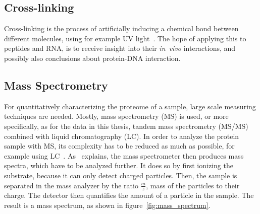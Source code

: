 	\subsection{Cross-linking}
	\label{lab:background:cross-linking}
	Cross-linking is the process of artificially inducing a chemical bond between different molecules, using for example UV light~\cite{Sachsenberg2017}. The hope of applying this to peptides and RNA, is to receive insight into their \textit{in~vivo} interactions, and possibly also conclusions about protein-DNA interaction.\\
	\subsection{Mass Spectrometry}
	\label{lab:background:ms}
	For quantitatively characterizing the proteome of a sample, large scale measuring techniques are needed. Mostly, mass spectrometry (MS) is used, or more specifically, as for the data in this thesis, tandem mass spectrometry (MS/MS) combined with liquid chromatography (LC). In order to analyze the protein sample with MS, its complexity has to be reduced as much as possible, for example using LC~\cite{Sachsenberg2017}. As~\citet{Han2008} explains, the mass spectrometer then produces mass spectra, which have to be analyzed further. It does so by first ionizing the substrate, because it can only detect charged particles. Then, the sample is separated in the mass analyzer by the ratio $\frac{m}{z}$, mass of the particles to their charge. The detector then quantifies the amount of a particle in the sample. The result is a mass spectrum, as shown in figure~\ref{fig:mass_spectrum}.\\
	\renewcommand{\baselinestretch}{0.9}
